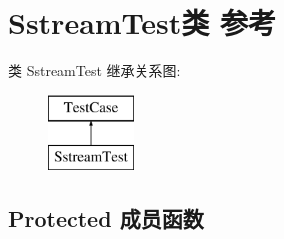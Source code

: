 \hypertarget{class_sstream_test}{}\section{Sstream\+Test类 参考}
\label{class_sstream_test}
类 Sstream\+Test 继承关系图\+:\begin{figure}[H]
\begin{center}
\leavevmode
\includegraphics[height=2.000000cm]{class_sstream_test}
\end{center}
\end{figure}
\subsection*{Protected 成员函数}
